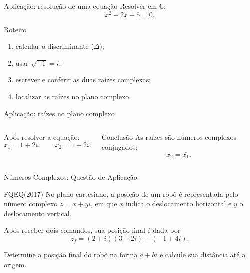 \documentclass[aspectratio=169]{beamer}
\newcommand{\EspacoEscrita}[1]{%
  \vspace{0.25em}
  \begin{minipage}[t][#1][t]{\linewidth}
  \end{minipage}
}
\begin{document}
\begin{frame}{Aplicação: resolução de uma equação}
\vspace{-0.25em}
\small
Resolver em $\mathbb{C}$:
\[
  x^2-2x+5=0.
\]
\begin{block}{Roteiro}
\begin{enumerate}
  \item calcular o discriminante ($\Delta$);
  \item usar $\sqrt{-1}=i$;
  \item escrever e conferir as duas raízes complexas;
  \item localizar as raízes no plano complexo.
\end{enumerate}
\end{block}
\EspacoEscrita{0.20\textheight}
\end{frame}

\begin{frame}{Aplicação: raízes no plano complexo}
\vspace{-0.65em}
\begin{columns}[T,onlytextwidth]
\small
Após resolver a equação:
\[
  x_1=1+2i,
  \qquad
  x_2=1-2i.
\]

\begin{block}{Conclusão}
As raízes são números complexos conjugados:
\[
  x_2=\overline{x_1}.
\]
\end{block}

\vspace{-.25cm}
\centering

\end{columns}
\end{frame}


\begin{frame}[t]{Números Complexos: Questão de Aplicação}

\vspace{-.5cm}

\footnotesize

\begin{block}{FQEQ(2017)}
No plano cartesiano, a posição de um robô é representada pelo número complexo
$z=x+yi$, em que $x$ indica o deslocamento horizontal e $y$ o deslocamento vertical.

Após receber dois comandos, sua posição final é dada por
\[
z_f=(2+i)(3-2i)+(-1+4i).
\]

Determine a posição final do robô na forma $a+bi$ e calcule sua distância até a origem.
\end{block}

\end{frame}
\end{document}
